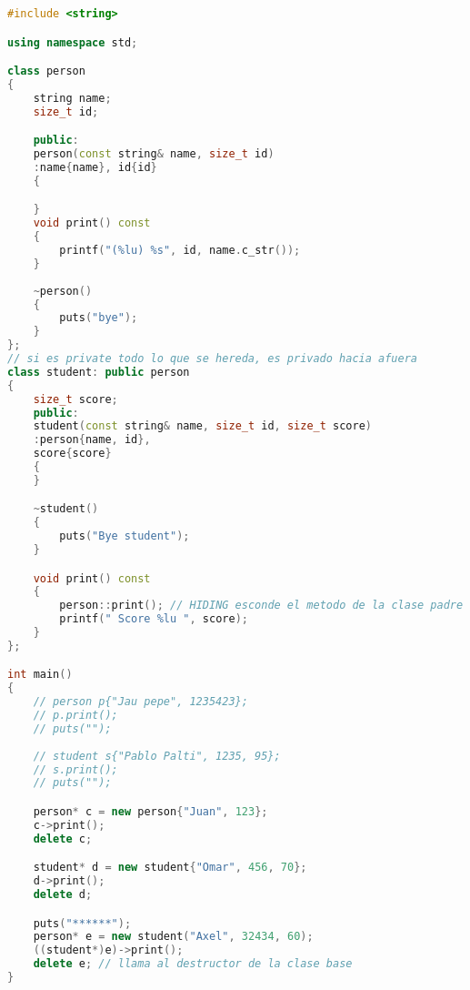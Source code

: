 \begin{lstlisting}[language=C++, caption={Herencia}]
#include <string>

using namespace std;

class person
{
    string name;
    size_t id;

    public:
    person(const string& name, size_t id)
    :name{name}, id{id}
    {

    }
    void print() const
    {
        printf("(%lu) %s", id, name.c_str());
    }
    
    ~person()
    {
        puts("bye");
    }
};
// si es private todo lo que se hereda, es privado hacia afuera
class student: public person
{
    size_t score;
    public:
    student(const string& name, size_t id, size_t score)
    :person{name, id},
    score{score}
    {
    }

    ~student()
    {
        puts("Bye student");
    }

    void print() const
    {
        person::print(); // HIDING esconde el metodo de la clase padre
        printf(" Score %lu ", score);
    }
};

int main()
{
    // person p{"Jau pepe", 1235423};
    // p.print();
    // puts("");
    
    // student s{"Pablo Palti", 1235, 95};
    // s.print();
    // puts("");

    person* c = new person{"Juan", 123};
    c->print();
    delete c;

    student* d = new student{"Omar", 456, 70};
    d->print();
    delete d;

    puts("******");
    person* e = new student("Axel", 32434, 60);
    ((student*)e)->print();
    delete e; // llama al destructor de la clase base
}
    
\end{lstlisting}

